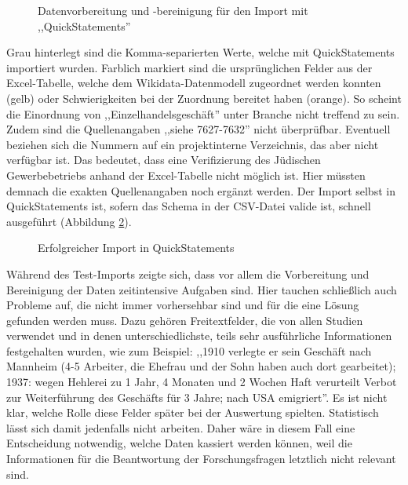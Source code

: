 \begin{figure}[h]
    \centering
    \caption[QuickStatements: Datenvorbereitung und -bereinigung]{Datenvorbereitung und -bereinigung für den Import mit ,,QuickStatements''}
    \label{fig:wikidatacleanup}
\end{figure}

Grau hinterlegt sind die Komma-separierten Werte, welche mit QuickStatements importiert wurden. Farblich markiert sind die ursprünglichen Felder aus der Excel-Tabelle, welche dem Wikidata-Datenmodell zugeordnet werden konnten (gelb) oder Schwierigkeiten bei der Zuordnung bereitet haben (orange). So scheint die Einordnung von ,,Einzelhandelsgeschäft'' unter Branche nicht treffend zu sein. Zudem sind die Quellenangaben ,,siehe 7627-7632'' nicht überprüfbar. Eventuell beziehen sich die Nummern auf ein projektinterne Verzeichnis, das aber nicht verfügbar ist. Das bedeutet, dass eine Verifizierung des Jüdischen Gewerbebetriebs anhand der Excel-Tabelle nicht möglich ist. Hier müssten demnach die exakten Quellenangaben noch ergänzt werden. Der Import selbst in QuickStatements ist, sofern das Schema in der CSV-Datei valide ist, schnell ausgeführt (Abbildung \ref{fig:wikidataquickstatements}).

\begin{figure}[h]
    \centering
    \caption{Erfolgreicher Import in QuickStatements}
    \label{fig:wikidataquickstatements}
\end{figure}

Während des Test-Imports zeigte sich, dass vor allem die Vorbereitung und Bereinigung der Daten zeitintensive Aufgaben sind. Hier tauchen schließlich auch Probleme auf, die nicht immer vorhersehbar sind und für die eine Lösung gefunden werden muss. Dazu gehören Freitextfelder, die von allen Studien verwendet und in denen unterschiedlichste, teils sehr ausführliche Informationen festgehalten wurden, wie zum Beispiel: ,,1910 verlegte er sein Geschäft nach Mannheim (4-5 Arbeiter, die Ehefrau und der Sohn haben auch dort gearbeitet); 1937: wegen Hehlerei zu 1 Jahr, 4 Monaten und 2 Wochen Haft verurteilt Verbot zur Weiterführung des Geschäfts für 3 Jahre; nach USA emigriert''. Es ist nicht klar, welche Rolle diese Felder später bei der Auswertung spielten. Statistisch lässt sich damit jedenfalls nicht arbeiten. Daher wäre in diesem Fall eine Entscheidung notwendig, welche Daten kassiert werden können, weil die Informationen für die Beantwortung der Forschungsfragen letztlich nicht relevant sind.  

